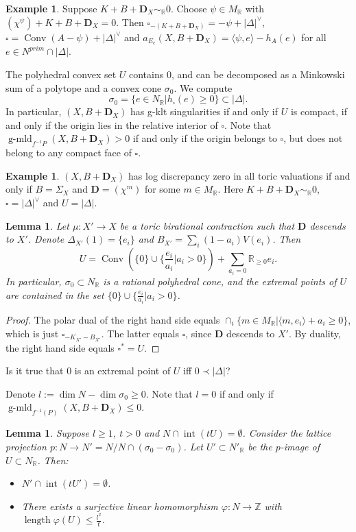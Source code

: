 \documentclass[12pt,twoside]{amsart}
\newcommand{\Z}{{\mathbb Z}}
\newcommand{\R}{{\mathbb R}}
\newcommand{\bD}{{\mathbf D}}
\newcommand{\Conv}{\operatorname{Conv}}
\newcommand{\Int}{\operatorname{int}}
\newcommand{\length}{\operatorname{length}}
\newcommand{\gmld}{\operatorname{g-mld}}
\theoremstyle{plain}
\newtheorem{lem}[thm]{Lemma}
\theoremstyle{definition}
\newtheorem{exmp}[thm]{Example}
\theoremstyle{remark}
\begin{document}
\begin{exmp}
	Suppose $K+B+\bD_X\sim_\R 0$. Choose $\psi\in M_\R$ with $(\chi^\psi)+K+B+\bD_X=0$.
	Then $\square_{-(K+B+\bD_X)}=-\psi+|\Delta|^\vee$, $\square=\Conv(A-\psi)+|\Delta|^\vee$ and 
	$a_{E_e}(X,B+\bD_X)=\langle \psi,e\rangle-h_A(e)$ for all $e\in N^{prim}\cap |\Delta|$.
\end{exmp}

The polyhedral convex set $U$ contains $0$, and can be decomposed as a Minkowski sum of
a polytope and a convex cone $\sigma_0$. We compute
$$
\sigma_0=\{e\in N_\R | h_\square(e) \ge 0 \} \subset |\Delta|.
$$
In particular, $(X,B+\bD_X)$ has g-klt singularities if and only if 
$U$ is compact, if and only if the origin lies in the relative interior of $\square$.
Note that $\gmld_{f^{-1}P}(X,B+\bD_X)>0$ if and only if the origin belongs to $\square$,
but does not belong to any compact face of $\square$.

\begin{exmp}
	$(X,B+\bD_X)$ has log discrepancy zero in all toric valuations if and only if 
	$B=\Sigma_X$ and $\bD=(\chi^m)$ for some $m\in M_\R$. Here $K+B+\bD_X\sim_\R 0$, 
	$\square=|\Delta|^\vee$ and $U=|\Delta|$.
\end{exmp}

\begin{lem}
	Let $\mu\colon X'\to X$ be a toric birational contraction such that $\bD$ descends to $X'$.
	Denote $\Delta_{X'}(1)=\{e_i\}$ and $B_{X'}=\sum_i(1-a_i)V(e_i)$. Then 
	$$
	U=\Conv(\{0\}\cup\{ \frac{e_i}{a_i} | a_i>0\})+\sum_{a_i=0}\R_{\ge 0}e_i.
	$$
	In particular, $\sigma_0\subset N_\R$ is a rational polyhedral cone, and
	the extremal points of $U$ are contained in the set $\{0\}\cup \{ \frac{e_i}{a_i} | a_i>0\}$.
\end{lem}

\begin{proof}
The polar dual of the right hand side equals $\cap_i \{m\in M_\R | \langle m,e_i\rangle+a_i\ge 0\}$,
which is just $\square_{-K_{X'}-B_{X'}}$. The latter equals $\square$, since $\bD$ descends to 
$X'$. By duality, the right hand side equals $\square^*=U$.
\end{proof}

Is it true that $0$ is an extremal point of $U$ iff $0\prec |\Delta|$?

Denote $l:=\dim N-\dim \sigma_0\ge 0$. Note that $l=0$ if and only if $\gmld_{f^{-1}(P)}(X,B+\bD_X)\le 0$.

\begin{lem}\label{ft} 
	Suppose $l\ge 1$, $t>0$ and $N\cap \Int(tU)=\emptyset$.
Consider the lattice projection $p\colon N\to N'=N/N\cap(\sigma_0-\sigma_0)$.
Let $U' \subset N'_\R$ be the $p$-image of $U\subset N_\R$. Then:
\begin{itemize}
	\item[a)] $N'\cap \Int(tU')=\emptyset$.
	\item[b)] There exists a surjective linear homomorphism $\varphi\colon N\to \Z$ with $\length \varphi(U)\le \frac{l^2}{t}$. 
\end{itemize}
\end{lem}
\end{document}
